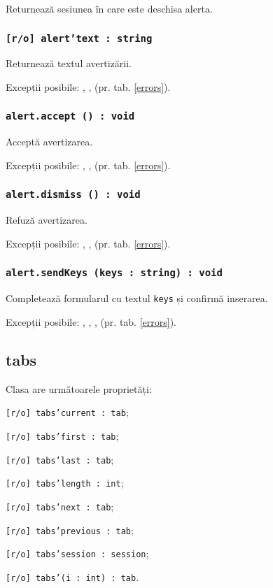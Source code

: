 Returnează sesiunea în care este deschisa alerta.

\subsubsection{\texttt{[r/o] alert'text : string}}

Returnează textul avertizării.

Excepții posibile: , ,  (pr. tab. \ref{errors}).

\subsubsection{\texttt{alert.accept () : void}}

Acceptă avertizarea.

Excepții posibile: , ,  (pr. tab. \ref{errors}).

\subsubsection{\texttt{alert.dismiss () : void}}

Refuză avertizarea.

Excepții posibile: , ,  (pr. tab. \ref{errors}).

\subsubsection{\texttt{alert.sendKeys (keys : string) : void}}

Completează formularul cu textul \texttt{keys} și confirmă inserarea.

Excepții posibile: , , ,  (pr. tab. \ref{errors}).

\subsection{tabs}

Clasa \tabs{} are următoarele proprietăți:
\begin{icItems}
	\item \texttt{[r/o] tabs'current : tab};
	\item \texttt{[r/o] tabs'first : tab};
	\item \texttt{[r/o] tabs'last : tab};
	\item \texttt{[r/o] tabs'length : int};
	\item \texttt{[r/o] tabs'next : tab};
	\item \texttt{[r/o] tabs'previous : tab};
	\item \texttt{[r/o] tabs'session : session};
	\item \texttt{[r/o] tabs'(i : int) : tab}.
\end{icItems}

